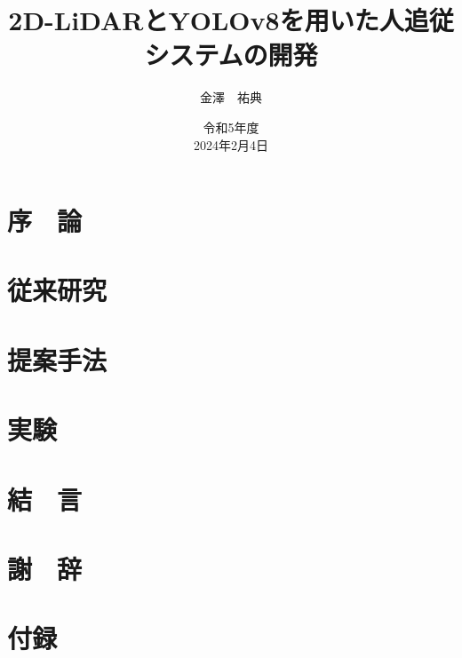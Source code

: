 \documentclass[12pt,a4paper]{jreport}
\title{2D-LiDARとYOLOv8を用いた人追従システムの開発}
\author{金澤　祐典}
\date{令和5年度\\2024年2月4日}
\begin{document}
\maketitle

\tableofcontents
\listoffigures
\listoftables
\newpage
{}
\setcounter{page}{1}

\chapter{序　論}

\chapter{従来研究}

\chapter{提案手法}

\chapter{実験}

\chapter{結　言}

\chapter*{謝　辞}



\chapter*{付録}

\end{document}
